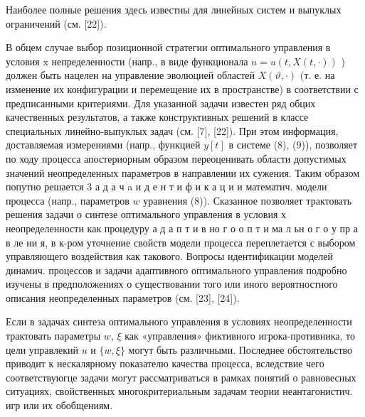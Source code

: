 \documentclass[10pt]{article}
\begin{document}
Наиболее полные решения здесь известны для линейных систем и выпуклых ограничений (см. [22]).

В обцем случае выбор позиционной стратегии оптимального управления в условия $\mathrm{x}$ непределенности (напр., в виде функционала $u=u(t, X(t, \cdot))$ ) должен быть нацелен на управление эволюцией областей $X(\vartheta, \cdot)$ (т. е. на изменение их конфигурации и перемещение их в пространстве) в соответствии с предписанными критериями. Для указанной задачи известен ряд обцих качественных результатов, а также конструктивных решений в классе специальных линейно-выпуклых задач (см. [7], [22]). При этом информация, доставляемая измерениями (напр., функцией $y[t]$ в системе (8), (9)), позволяет по ходу процесса апостериорным образом переоценивать области допустимых значений неопределенных параметров в направлении их сужения. Таким образом попутно решается 3 а д а ч a и д е н т и ф и к а ц и и математич. модели процесса (напр., параметров $w$ уравнения (8)). Сказанное позволяет трактовать решения задачи о синтезе оптимального управления в условия х неопределенности как процедуру а д а п т и в но г о о п т и ма л ьн о г о у пр а в ле ни я, в к-ром уточнение свойств модели процесса переплетается с выбором управляющего воздействия как такового. Вопросы идентификации моделей динамич. процессов и задачи адаптивного оптимального управления подробно изучены в предположениях о существовании того или иного вероятностного описания неопределенных параметров (см. [23], [24]).

Если в задачах синтеза оптимального управления в условиях неопределенности трактовать параметры $w$, $\xi$ как «управления» фиктивного игрока-противника, то цели управлекий $u$ и $\{w, \xi\}$ могут быть различными. Последнее обстоятельство приводит к нескалярному показателю качества процесса, вследствие чего соответствуюгце задачи могут рассматриваться в рамках понятий о равновесных ситуациях, свойственных многокритериальным задачам теории неантагонистич. игр или их обобщениям.
\end{document}
